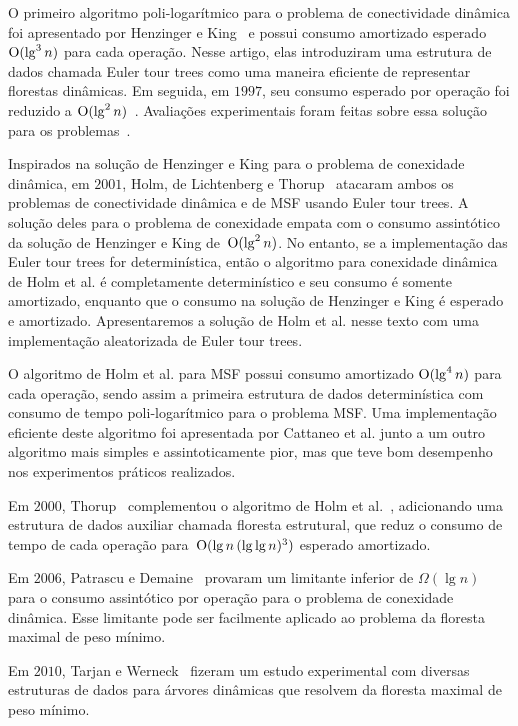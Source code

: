 O primeiro algoritmo poli-logarítmico para o problema de conectividade dinâmica foi apresentado por Henzinger e King~\cite{HenzingerKing} e possui consumo amortizado esperado $\mathrm{O}(\lg^3 n)$ para cada operação. Nesse artigo, elas introduziram uma estrutura de dados chamada Euler tour trees como uma maneira eficiente de representar florestas dinâmicas. Em seguida, em $1997$, seu consumo esperado por operação foi reduzido a $\mathrm{O}(\lg^2 n)$~\cite{HenzingerThorup}.  Avaliações experimentais foram feitas sobre essa solução para os problemas~\cite{EmpiricalStudy1997, EmpiricalStudy2002, Zaroliagis2002}.

Inspirados na solução de Henzinger e King para o problema de conexidade dinâmica, em $2001$, Holm, de Lichtenberg e Thorup~\cite{poly_log} atacaram ambos os problemas de conectividade dinâmica e de MSF usando Euler tour trees.
A solução deles para o problema de conexidade empata com o consumo assintótico da solução de Henzinger e King de~$\mathrm{O}(\lg^2 n)$.
No entanto, se a implementação das Euler tour trees for determinística, então o algoritmo para conexidade dinâmica de Holm et al. é completamente determinístico e seu consumo é somente amortizado,
enquanto que o consumo na solução de Henzinger e King é esperado e amortizado. 
Apresentaremos a solução de Holm et al. nesse texto com uma implementação aleatorizada de Euler tour trees.

O algoritmo de Holm et al. para MSF possui consumo amortizado $\mathrm{O}(\lg^4 n)$ para cada operação, sendo assim a primeira estrutura de dados determinística com consumo de tempo poli-logarítmico para o problema MSF. Uma implementação eficiente deste algoritmo foi apresentada por Cattaneo et al. \cite{xpstudy2002} junto a um outro algoritmo mais simples e assintoticamente pior, mas que teve bom desempenho nos experimentos práticos realizados.

Em $2000$, Thorup~\cite{Thorup2000} complementou o algoritmo de Holm et al.~\cite{poly_log}, adicionando uma estrutura de dados auxiliar chamada floresta estrutural, que reduz o consumo de tempo de cada operação para~$\mathrm{O}(\lg n\, (\lg\lg n)^3)$ esperado amortizado.

Em $2006$, Patrascu e Demaine~\cite{lowerBoundPatrascu} provaram um limitante inferior de $\Omega(\lg n)$ para o consumo assintótico por operação para o problema de conexidade dinâmica.
Esse limitante pode ser facilmente aplicado ao problema da floresta maximal de peso mínimo.

Em $2010$, Tarjan e Werneck~\cite{tarjanWerneck2010} fizeram um estudo experimental com diversas estruturas de dados para árvores dinâmicas que resolvem  da floresta maximal de peso mínimo.

